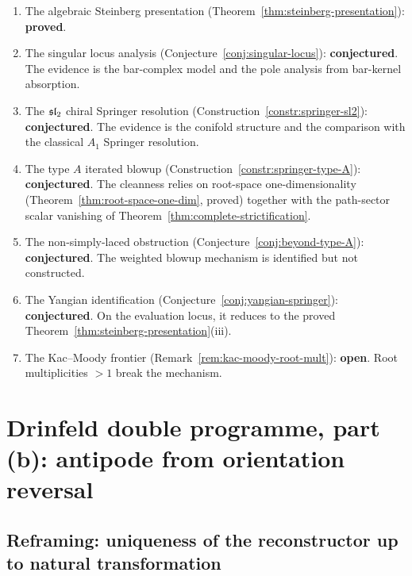\begin{remark}
\label{rem:springer-status}
\begin{enumerate}[label=(\roman*)]
\item The algebraic Steinberg presentation
 (Theorem~\ref{thm:steinberg-presentation}): \textbf{proved}.
\item The singular locus analysis
 (Conjecture~\ref{conj:singular-locus}): \textbf{conjectured}.
 The evidence is the bar-complex model and the pole analysis from bar-kernel absorption.
\item The $\mathfrak{sl}_2$ chiral Springer resolution
 (Construction~\ref{constr:springer-sl2}): \textbf{conjectured}.
 The evidence is the conifold structure and the comparison with
 the classical $A_1$ Springer resolution.
\item The type $A$ iterated blowup
 (Construction~\ref{constr:springer-type-A}): \textbf{conjectured}.
 The cleanness relies on root-space one-dimensionality
 (Theorem~\ref{thm:root-space-one-dim}, proved) together with the
 path-sector scalar vanishing of
 Theorem~\ref{thm:complete-strictification}.
\item The non-simply-laced obstruction
 (Conjecture~\ref{conj:beyond-type-A}): \textbf{conjectured}.
 The weighted blowup mechanism is identified but not constructed.
\item The Yangian identification
 (Conjecture~\ref{conj:yangian-springer}): \textbf{conjectured}.
 On the evaluation locus, it reduces to the proved
 Theorem~\ref{thm:steinberg-presentation}(iii).
\item The Kac--Moody frontier
 (Remark~\ref{rem:kac-moody-root-mult}): \textbf{open}.
 Root multiplicities $> 1$ break the mechanism.
\end{enumerate}
\end{remark}

\section{Drinfeld double programme, part (b): antipode from orientation reversal}
\label{sec:drinfeld-double-antipode}

\subsection*{Reframing: uniqueness of the reconstructor up to natural transformation}

